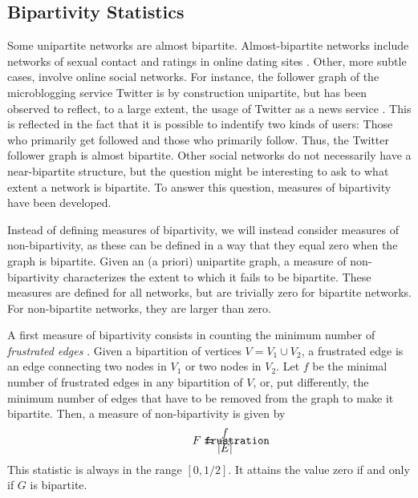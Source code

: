 \documentclass{article}
\def\mathnote#1{%
  \tag*{\rlap{\hspace\marginparsep\smash{\parbox[t]{\marginparwidth}{#1}}}}
}
\begin{document}
\subsection{Bipartivity Statistics}
Some unipartite networks are almost bipartite.  Almost-bipartite
networks include networks of sexual contact \citep{b719} and ratings in
online dating sites \citep{b311,kunegis:split-complex-dating}.  Other,
more subtle cases, involve online social networks.  For instance, the
follower graph of the microblogging service Twitter is by construction
unipartite, but has been observed to reflect, to a large extent, the
usage of Twitter as a news service \citep{b545}. This is reflected in the
fact that it is possible to indentify two kinds of users: Those who
primarily get followed and those who primarily follow.  Thus, the
Twitter follower graph is almost bipartite.  Other social networks do
not necessarily have a near-bipartite structure, but the question might
be interesting to ask to what extent a network is bipartite.  To answer
this question, measures of bipartivity have been developed.

Instead of defining measures of bipartivity, we will instead consider
measures of non-bipartivity, as these can be defined in a way that they
equal zero when the graph is bipartite.  Given an (a priori) unipartite
graph, a measure of non-bipartivity characterizes the extent to which it
fails to be bipartite.  These measures are defined for all networks, but
are trivially zero for bipartite networks.  For non-bipartite networks,
they are larger than zero.

A first measure of bipartivity consists in counting the minimum number
of \emph{frustrated edges} \citep{b531}. Given a bipartition of vertices
$V=V_1\cup V_2$, a frustrated edge is an edge connecting two nodes in
$V_1$ or two nodes in $V_2$.  Let $f$ be the minimal number of
frustrated edges in any bipartition of $V$, or, put differently, the
minimum number of edges that have to be removed from the graph to make
it bipartite.  Then, a measure of non-bipartivity is given by
\begin{align}
  \mathnote{\texttt{frustration}} F &= \frac f {|E|}.
\end{align}
This statistic is always in the range $[0, 1/2]$.  It attains the value
zero if and only if $G$ is bipartite.
\end{document}
